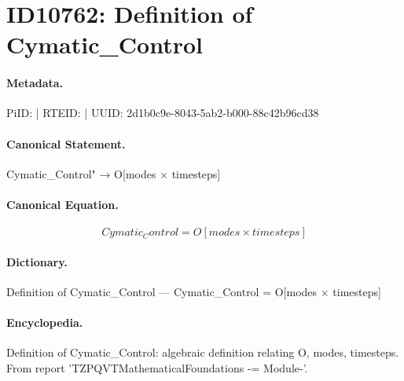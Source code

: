 \section*{ID10762: Definition of Cymatic\_Control}
\paragraph{Metadata.}
PiID:  | RTEID:  | UUID: 2d1b0c9e-8043-5ab2-b000-88c42b96cd38

\paragraph{Canonical Statement.}
Cymatic\_Control" → O[modes × timesteps]

\paragraph{Canonical Equation.}
\[
Cymatic_Control = O[modes × timesteps]
\]

\paragraph{Dictionary.}
Definition of Cymatic\_Control — Cymatic\_Control = O[modes × timesteps]

\paragraph{Encyclopedia.}
Definition of Cymatic\_Control: algebraic definition relating O, modes, timesteps. From report 'TZPQVTMathematicalFoundations -= Module-'.
